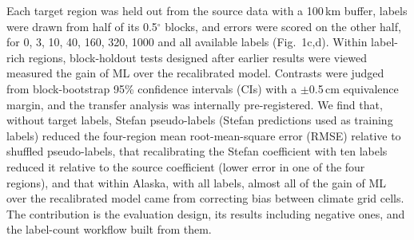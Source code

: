 Each target region was held out from the source data with a 100\,km buffer, labels were drawn from half of its 0.5$^{\circ}$ blocks, and errors were scored on the other half, for 0, 3, 10, 40, 160, 320, 1000 and all available labels (Fig.~1c,d). Within label-rich regions, block-holdout tests designed after earlier results were viewed measured the gain of ML over the recalibrated model. Contrasts were judged from block-bootstrap 95\% confidence intervals (CIs) with a $\pm$0.5\,cm equivalence margin, and the transfer analysis was internally pre-registered. We find that, without target labels, Stefan pseudo-labels (Stefan predictions used as training labels) reduced the four-region mean root-mean-square error (RMSE) relative to shuffled pseudo-labels, that recalibrating the Stefan coefficient with ten labels reduced it relative to the source coefficient (lower error in one of the four regions), and that within Alaska, with all labels, almost all of the gain of ML over the recalibrated model came from correcting bias between climate grid cells. The contribution is the evaluation design, its results including negative ones, and the label-count workflow built from them.
